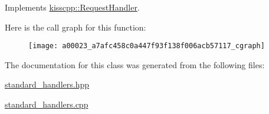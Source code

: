 Implements \hyperlink{a00037_a3606f772c07297826847a8e36226cdaa}{kisscpp\-::\-Request\-Handler}.



Here is the call graph for this function\-:\nopagebreak
\begin{figure}[H]
\begin{center}
\leavevmode
\texttt{[image: a00023\_a7afc458c0a447f93f138f006acb57117\_cgraph]}
\end{center}
\end{figure}




The documentation for this class was generated from the following files\-:\begin{DoxyCompactItemize}
\item 
\hyperlink{a00079}{standard\-\_\-handlers.\-hpp}\item 
\hyperlink{a00078}{standard\-\_\-handlers.\-cpp}\end{DoxyCompactItemize}
